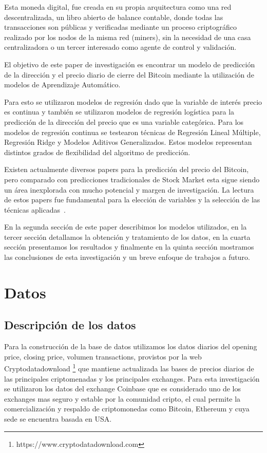\documentclass[a4paper,12pt,twocolumn]{article}
\begin{document}
Esta moneda digital, fue creada en su propia arquitectura como una red descentralizada, un libro abierto de balance contable, donde todas las transacciones son públicas y verificadas mediante un proceso criptográfico realizado por los nodos de la misma red (miners), sin la necesidad de una casa centralizadora o un tercer interesado como agente de control y validación\cite{Satoshi}. 

El objetivo de este paper de investigación es encontrar un modelo de predicción de la dirección y el  precio diario de cierre del Bitcoin mediante la utilización de modelos de Aprendizaje Automático. 

Para esto se utilizaron modelos de regresión dado que la variable de interés precio es continua y también se utilizaron modelos de regresión logística para la predicción de la dirección del precio que es una variable categórica. Para los modelos de regresión continua se testearon técnicas de Regresión Lineal Múltiple, Regresión Ridge y Modelos Aditivos Generalizados. Estos modelos representan distintos grados de flexibilidad del algoritmo de predicción. 

Existen actualmente diversos papers para la predicción del precio del Bitcoin, pero comparado con predicciones tradicionales de Stock Market esta sigue siendo un área inexplorada con mucho potencial y margen de investigación. La lectura de estos papers fue fundamental para la elección de variables y la selección de las técnicas aplicadas~\cite{mainDriversBitcoin}.

En la segunda sección de este paper describimos los modelos utilizados, en la tercer sección detallamos la obtención y tratamiento de los datos, en la cuarta sección presentamos los resultados y finalmente en la quinta sección mostramos las conclusiones de esta investigación y un breve enfoque de trabajos a futuro.



\section{Datos}
\subsection{Descripción de los datos}

Para la construcción de la base de datos utilizamos los datos diarios del opening price, closing price, volumen transactions,  provistos por la web Cryptodatadownload \footnote{https://www.cryptodatadownload.com}  que mantiene actualizada las bases de precios diarios de las principales criptomenadas y los principales exchanges. Para esta investigación se utilizaron los datos del exchange Coinbase que es considerado uno de los exchanges  mas seguro y estable por la comunidad cripto, el cual permite la comercialización y respaldo de criptomonedas como Bitcoin, Ethereum y cuya sede se encuentra basada en USA. 
\end{document}
